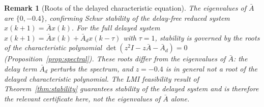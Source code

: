 \documentclass[10pt]{amsart}
\numberwithin{equation}{section}
\newtheorem{remark}[theorem]{Remark}
\begin{document}
\begin{remark}[Roots of the delayed characteristic equation]\label{rem:delayed_char}
The eigenvalues of $\bar{A}$ are $\{0, -0.4\}$, confirming Schur stability of the
delay-free reduced system $x(k+1)=\bar{A}x(k)$. For the full delayed system
$x(k+1) = \bar{A}x(k) + \bar{A}_d x(k-\tau)$ with $\tau=1$, stability is governed by
the roots of the characteristic polynomial
$\det(z^2 I - z\bar{A} - \bar{A}_d) = 0$ (Proposition~\ref{prop:spectral}). These
roots \emph{differ} from the eigenvalues of $\bar{A}$: the delay term $\bar{A}_d$
perturbs the spectrum, and $z = -0.4$ is in general not a root of the delayed
characteristic polynomial. The LMI feasibility result of Theorem~\ref{thm:stability}
guarantees stability of the \emph{delayed} system and is therefore the relevant
certificate here, not the eigenvalues of $\bar{A}$ alone.
\end{remark}
\end{document}
